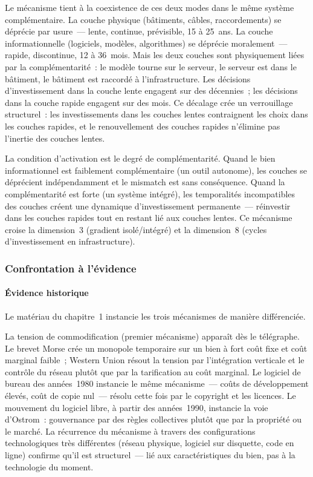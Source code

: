 Le mécanisme tient à la coexistence de ces deux modes dans le même système complémentaire. La couche physique (bâtiments, câbles, raccordements) se déprécie par usure~--- lente, continue, prévisible, 15 à 25~ans. La couche informationnelle (logiciels, modèles, algorithmes) se déprécie moralement~--- rapide, discontinue, 12 à 36~mois. Mais les deux couches sont physiquement liées par la complémentarité~: le modèle tourne sur le serveur, le serveur est dans le bâtiment, le bâtiment est raccordé à l'infrastructure. Les décisions d'investissement dans la couche lente engagent sur des décennies~; les décisions dans la couche rapide engagent sur des mois. Ce décalage crée un verrouillage structurel~: les investissements dans les couches lentes contraignent les choix dans les couches rapides, et le renouvellement des couches rapides n'élimine pas l'inertie des couches lentes.

La condition d'activation est le degré de complémentarité. Quand le bien informationnel est faiblement complémentaire (un outil autonome), les couches se déprécient indépendamment et le mismatch est sans conséquence. Quand la complémentarité est forte (un système intégré), les temporalités incompatibles des couches créent une dynamique d'investissement permanente~--- réinvestir dans les couches rapides tout en restant lié aux couches lentes. Ce mécanisme croise la dimension~3 (gradient isolé/intégré) et la dimension~8 (cycles d'investissement en infrastructure).


\subsubsection{Confrontation à l'évidence}

\paragraph{Évidence historique}

Le matériau du chapitre~1 instancie les trois mécanismes de manière différenciée.

La tension de commodification (premier mécanisme) apparaît dès le télégraphe. Le brevet Morse crée un monopole temporaire sur un bien à fort coût fixe et coût marginal faible~; Western Union résout la tension par l'intégration verticale et le contrôle du réseau plutôt que par la tarification au coût marginal. Le logiciel de bureau des années~1980 instancie le même mécanisme~--- coûts de développement élevés, coût de copie nul~--- résolu cette fois par le copyright et les licences. Le mouvement du logiciel libre, à partir des années~1990, instancie la voie d'Ostrom~: gouvernance par des règles collectives plutôt que par la propriété ou le marché. La récurrence du mécanisme à travers des configurations technologiques très différentes (réseau physique, logiciel sur disquette, code en ligne) confirme qu'il est structurel~--- lié aux caractéristiques du bien, pas à la technologie du moment.

